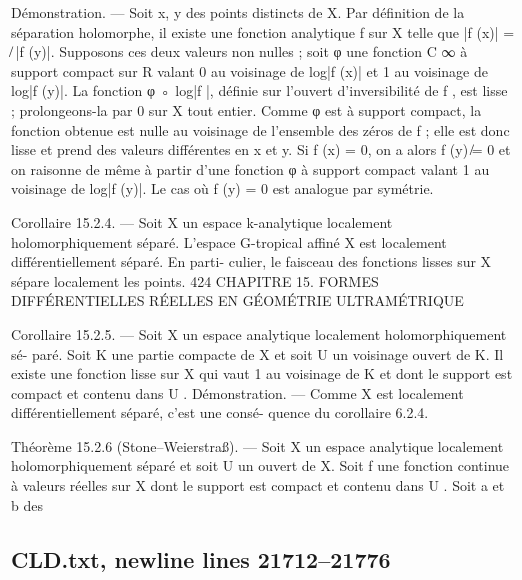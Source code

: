 \documentclass[
  10pt,
]{article}
\newenvironment{Shaded}{}{}
\newcommand{\NormalTok}[1]{#1}
\begin{document}
\begin{Shaded}
\begin{Highlighting}[]
\NormalTok{Démonstration. — Soit x, y des points distincts de X. Par définition de la séparation}
\NormalTok{holomorphe, il existe une fonction analytique f sur X telle que |f (x)| =     ̸ |f (y)|.}
\NormalTok{  Supposons ces deux valeurs non nulles ; soit φ une fonction C ∞ à support compact}
\NormalTok{sur R valant 0 au voisinage de log|f (x)| et 1 au voisinage de log|f (y)|. La fonction}
\NormalTok{φ ◦ log|f |, définie sur l’ouvert d’inversibilité de f , est lisse ; prolongeons{-}la par 0 sur X}
\NormalTok{tout entier. Comme φ est à support compact, la fonction obtenue est nulle au voisinage}
\NormalTok{de l’ensemble des zéros de f ; elle est donc lisse et prend des valeurs différentes en x et y.}
\NormalTok{  Si f (x) = 0, on a alors f (y) ̸= 0 et on raisonne de même à partir d’une fonction φ à}
\NormalTok{support compact valant 1 au voisinage de log|f (y)|.}
\NormalTok{  Le cas où f (y) = 0 est analogue par symétrie.}

\NormalTok{Corollaire 15.2.4. — Soit X un espace k{-}analytique localement holomorphiquement}
\NormalTok{séparé. L’espace G{-}tropical affiné X est localement différentiellement séparé. En parti{-}}
\NormalTok{culier, le faisceau des fonctions lisses sur X sépare localement les points.}
\NormalTok{424 CHAPITRE 15. FORMES DIFFÉRENTIELLES RÉELLES EN GÉOMÉTRIE ULTRAMÉTRIQUE}

\NormalTok{Corollaire 15.2.5. — Soit X un espace analytique localement holomorphiquement sé{-}}
\NormalTok{paré. Soit K une partie compacte de X et soit U un voisinage ouvert de K. Il existe}
\NormalTok{une fonction lisse sur X qui vaut 1 au voisinage de K et dont le support est compact et}
\NormalTok{contenu dans U .}
\NormalTok{Démonstration. — Comme X est localement différentiellement séparé, c’est une consé{-}}
\NormalTok{quence du corollaire 6.2.4.}

\NormalTok{Théorème 15.2.6 (Stone–Weierstraß). — Soit X un espace analytique localement}
\NormalTok{holomorphiquement séparé et soit U un ouvert de X. Soit f une fonction continue à}
\NormalTok{valeurs réelles sur X dont le support est compact et contenu dans U . Soit a et b des}
\end{Highlighting}
\end{Shaded}

\subsection{CLD.txt, newline lines
21712--21776}\label{cld.txt-newline-lines-2171221776}
\end{document}
